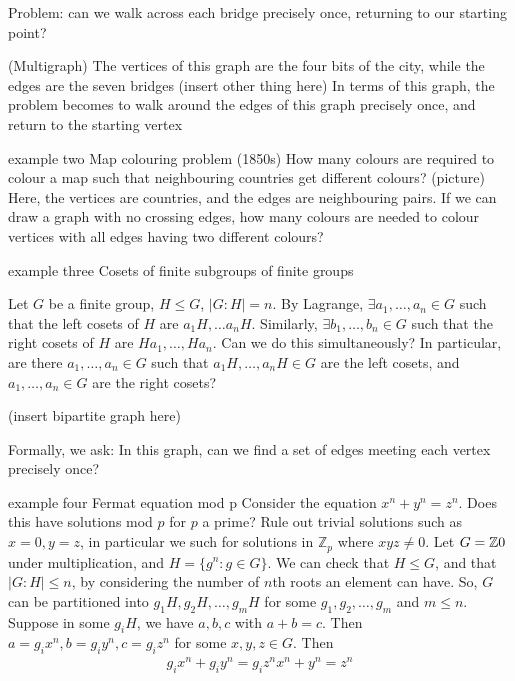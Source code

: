 \documentclass{article}
\begin{document}
Problem: can we walk across each bridge precisely once, returning to our starting point?

(Multigraph) The vertices of this graph are the four bits of the city, while the edges are the seven bridges
(insert other thing here)
In terms of this graph, the problem becomes to walk around the edges of this graph precisely once, and return to the starting vertex

example two
Map colouring problem (1850s)
How many colours are required to colour a map such that neighbouring countries get different colours?
(picture)
Here, the vertices are countries, and the edges are neighbouring pairs.
If we can draw a graph with no crossing edges, how many colours are needed to colour vertices with all edges having two different colours?

example three
Cosets of finite subgroups of finite groups

Let $G$ be a finite group, $H \leq G$, $|G : H| = n$.  By Lagrange, $\exists a_1, \dots, a_n \in G$ such that the left cosets of $H$ are $a_1 H, \dots a_n H$.  Similarly, $\exists b_1, \dots, b_n \in G$ such that the right cosets of $H$ are $H a_1, \dots, H a_n$.
Can we do this simultaneously? In particular, are there $a_1, \dots, a_n \in G$ such that $a_1 H, \dots, a_n H \in G$ are the left cosets, and $a_1, \dots, a_n \in G$ are the right cosets?

(insert bipartite graph here)

Formally, we ask: In this graph, can we find a set of edges meeting each vertex precisely once?

example four
Fermat equation mod p
Consider the equation $x^n + y^n = z^n$. Does this have solutions mod $p$ for $p$ a prime?  Rule out trivial solutions such as $x = 0, y = z$, in particular we such for solutions in $\mathbb{Z}_p$ where $xyz \ne 0$.
Let $G = \mathbb{Z} \\ {0}$ under multiplication, and $H = \{g^n : g \in G\}$.  We can check that $H \leq G$, and that $|G : H| \leq n$, by considering the number of $n$th roots an element can have.  So, $G$ can be partitioned into $g_1 H, g_2 H, \dots, g_mH$ for some $g_1, g_2, \dots, g_m$ and $m \leq n$.  Suppose in some $g_i H$, we have $a, b, c$ with $a + b = c$.  Then $a = g_i x^n, b = g_i y^n, c = g_i z^n$ for some $x, y, z \in G$.  Then
\begin{align}
  g_i x^n + g_i y^n = g_i z^n
  x^n + y^n = z^n
\end{align}
\end{document}
